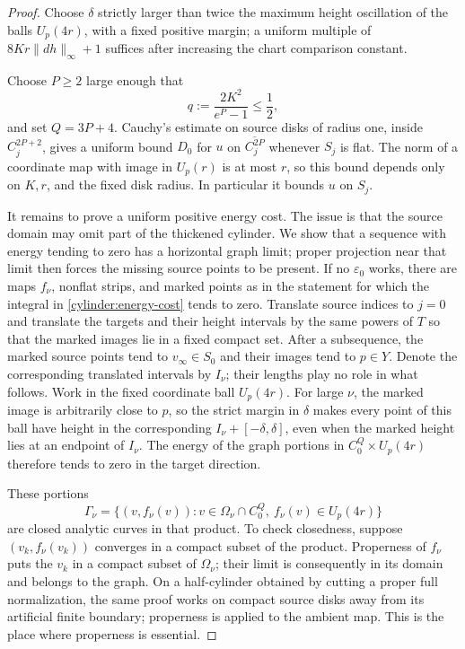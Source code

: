\begin{proof}
Choose $\delta$ strictly larger than twice the maximum height
oscillation of the balls $U_p(4r)$, with a fixed positive margin;
a uniform multiple of
$8Kr\|dh\|_\infty+1$ suffices after increasing the chart comparison
constant.

Choose $P\geq2$ large enough that
\begin{equation}\label{cylinder:q}
 q:=\frac{2K^2}{e^P-1}\leq\frac12,
\end{equation}
and set $Q=3P+4$.  Cauchy's estimate on source disks of radius one,
inside $C_j^{2P+2}$, gives a uniform bound $D_0$ for $u$ on
$\overline{C_j^{2P}}$ whenever $S_j$ is flat.  The norm of a coordinate
map with image in $U_p(r)$ is at most $r$, so this bound depends only
on $K,r$, and the fixed disk radius.  In particular it bounds $u$ on
$S_j$.

It remains to prove a uniform positive energy cost. The issue is that
the source domain may omit part of the thickened cylinder. We show
that a sequence with energy tending to zero has a horizontal graph
limit; proper projection near that limit then forces the missing
source points to be present. If no
$\varepsilon_0$ works, there are maps $f_\nu$, nonflat strips, and
marked points as in the statement for which the integral in
\eqref{cylinder:energy-cost} tends to zero. Translate source indices
to $j=0$ and translate the targets and their height intervals by the
same powers of $T$ so that the marked images lie in a fixed compact set.
After a subsequence, the marked source points tend to
$v_\infty\in S_0$ and their images tend to $p\in Y$. Denote the
corresponding translated intervals by $I_\nu$; their lengths play no
role in what follows.
Work in the fixed coordinate ball $U_p(4r)$. For large $\nu$, the marked image is
arbitrarily close to $p$, so the strict margin in $\delta$ makes every
point of this ball have height in the corresponding
$I_\nu+[-\delta,\delta]$, even when the marked height lies at an
endpoint of $I_\nu$. The energy of the graph
portions in
$C_0^Q\times U_p(4r)$ therefore tends to zero in the target direction.

These portions
\[
 \Gamma_\nu=\{(v,f_\nu(v)):v\in\Omega_\nu\cap C_0^Q,
                                  \ f_\nu(v)\in U_p(4r)\}
\]
are closed analytic curves in that product.  To check closedness,
suppose $(v_k,f_\nu(v_k))$ converges in a compact subset of the product.
Properness of $f_\nu$ puts the $v_k$ in a compact subset of
$\Omega_\nu$; their limit is consequently in its domain and belongs
to the graph. On a half-cylinder obtained by cutting a proper full
normalization, the same proof works on compact source disks away from
its artificial finite boundary; properness is applied to the ambient
map. This is the place where properness is essential.


\end{proof}
